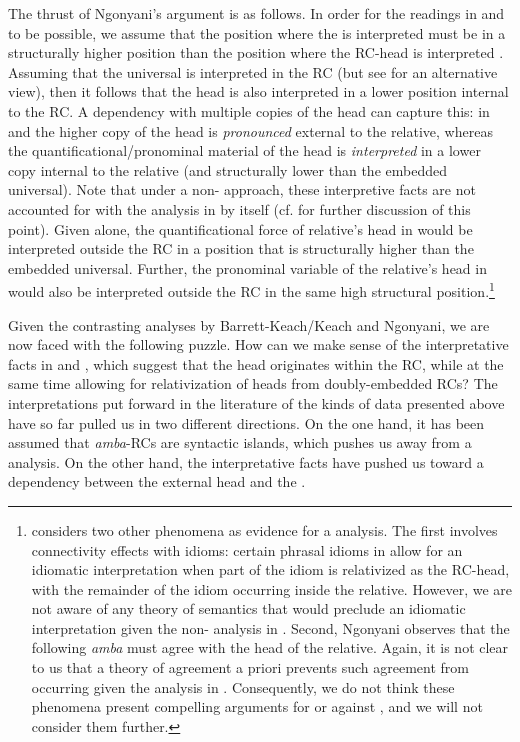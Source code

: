 \documentclass[output=paper,modfonts,nonflat,
colorlinks, citecolor=brown,
]{langsci/langscibook}
\begin{document}
The thrust of Ngonyani’s argument is as follows. In order for the readings in  and  to be possible, we assume that the position where the  is interpreted must be in a structurally higher position than the position where the RC-head is interpreted \citep[cf.][]{Heim1998}. Assuming that the universal is interpreted in the RC (but see  for an alternative view), then it follows that the head is also interpreted in a lower position internal to the RC. A  dependency with multiple copies of the head can capture this: in  and  the higher copy of the head is \textit{pronounced} external to the relative, whereas the quantificational/pronominal material of the head is \textit{interpreted} in a lower copy internal to the relative (and structurally lower than the embedded universal). Note that under a non- approach, these interpretive facts are not accounted for with the analysis in  by itself (cf.  for further discussion of this point). Given  alone, the quantificational force of relative’s head in  would be interpreted outside the RC in a position that is structurally higher than the embedded universal. Further, the pronominal variable of the relative’s head in  would also be interpreted outside the RC in the same high structural position.{}\footnote{\citet{Ngonyani2001} considers two other phenomena as evidence for a  analysis. The first involves connectivity effects with idioms: certain phrasal idioms in  allow for an idiomatic interpretation when part of the idiom is relativized as the RC-head, with the remainder of the idiom occurring inside the relative. However, we are not aware of any theory of semantics that would preclude an idiomatic interpretation given the non- analysis in . Second, Ngonyani observes that the  following \textit{amba} must agree with the head of the relative. Again, it is not clear to us that a theory of agreement a priori prevents such agreement from occurring given the analysis in . Consequently, we do not think these phenomena present compelling arguments for or against , and we will not consider them further.}

Given the contrasting analyses by Barrett-Keach/Keach and Ngonyani, we are now faced with the following puzzle. How can we make sense of the interpretative facts in  and , which suggest that the head originates within the RC, while at the same time allowing for relativization of heads from doubly-embedded RCs? The interpretations put forward in the literature of the kinds of data presented above have so far pulled us in two different directions. On the one hand, it has been assumed that \textit{amba}{}-RCs are syntactic islands, which pushes us away from a  analysis. On the other hand, the interpretative facts have pushed us toward a  dependency between the external head and the .
\end{document}
